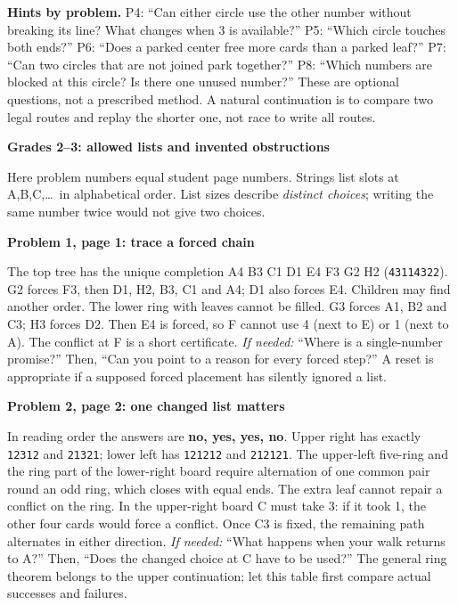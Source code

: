 \documentclass[10pt]{article}
\newcommand{\head}[1]{\par{\large\bfseries #1}\par}
\newcommand{\sub}[1]{\par\textbf{#1}\par}
\newcommand{\hint}[1]{\textit{If needed:} #1}
\newcommand{\word}[1]{\texttt{#1}}
\begin{document}
\textbf{Hints by problem.} P4: ``Can either circle use the other number without breaking its line? What changes when 3 is available?'' P5: ``Which circle touches both ends?'' P6: ``Does a parked center free more cards than a parked leaf?'' P7: ``Can two circles that are not joined park together?'' P8: ``Which numbers are blocked at this circle? Is there one unused number?'' These are optional questions, not a prescribed method. A natural continuation is to compare two legal routes and replay the shorter one, not race to write all routes.
\newpage
\head{Grades 2--3: allowed lists and invented obstructions}
Here problem numbers equal student page numbers. Strings list slots at A,B,C,\ldots\ in alphabetical order. List sizes describe \emph{distinct choices}; writing the same number twice would not give two choices.

\sub{Problem 1, page 1: trace a forced chain}
The top tree has the unique completion A4 B3 C1 D1 E4 F3 G2 H2 (\word{43114322}). G2 forces F3, then D1, H2, B3, C1 and A4; D1 also forces E4. Children may find another order. The lower ring with leaves cannot be filled. G3 forces A1, B2 and C3; H3 forces D2. Then E4 is forced, so F cannot use 4 (next to E) or 1 (next to A). The conflict at F is a short certificate. \hint{``Where is a single-number promise?'' Then, ``Can you point to a reason for every forced step?''} A reset is appropriate if a supposed forced placement has silently ignored a list.

\sub{Problem 2, page 2: one changed list matters}
In reading order the answers are \textbf{no, yes, yes, no}. Upper right has exactly \word{12312} and \word{21321}; lower left has \word{121212} and \word{212121}. The upper-left five-ring and the ring part of the lower-right board require alternation of one common pair round an odd ring, which closes with equal ends. The extra leaf cannot repair a conflict on the ring. In the upper-right board C must take 3: if it took 1, the other four cards would force a conflict. Once C3 is fixed, the remaining path alternates in either direction. \hint{``What happens when your walk returns to A?'' Then, ``Does the changed choice at C have to be used?''} The general ring theorem belongs to the upper continuation; let this table first compare actual successes and failures.
\end{document}
